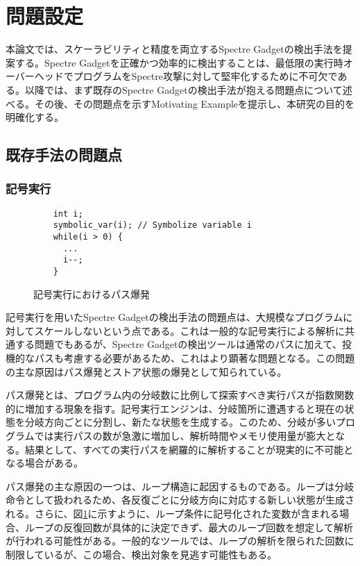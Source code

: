 \section{問題設定}
本論文では、スケーラビリティと精度を両立するSpectre Gadgetの検出手法を提案する。Spectre Gadgetを正確かつ効率的に検出することは、最低限の実行時オーバーヘッドでプログラムをSpectre攻撃に対して堅牢化するために不可欠である。以降では、まず既存のSpectre Gadgetの検出手法が抱える問題点について述べる。その後、その問題点を示すMotivating Exampleを提示し、本研究の目的を明確化する。

\subsection{既存手法の問題点}

\subsubsection{記号実行}

\begin{figure}
  \begin{verbatim}
    int i;
    symbolic_var(i); // Symbolize variable i
    while(i > 0) {
      ...
      i--;
    }
\end{verbatim}
  \caption{記号実行におけるパス爆発}
  \label{path_explosion}
\end{figure}



記号実行を用いたSpectre Gadgetの検出手法\cite{guarnieri2020spectector,wang2020kleespectre}の問題点は、大規模なプログラムに対してスケールしないという点である。これは一般的な記号実行による解析に共通する問題でもあるが、Spectre Gadgetの検出ツールは通常のパスに加えて、投機的なパスも考慮する必要があるため、これはより顕著な問題となる。この問題の主な原因はパス爆発とストア状態の爆発として知られている\cite{baldoni2018survey}。\par

パス爆発とは、プログラム内の分岐数に比例して探索すべき実行パスが指数関数的に増加する現象を指す。記号実行エンジンは、分岐箇所に遭遇すると現在の状態を分岐方向ごとに分割し、新たな状態を生成する。このため、分岐が多いプログラムでは実行パスの数が急激に増加し、解析時間やメモリ使用量が膨大となる。結果として、すべての実行パスを網羅的に解析することが現実的に不可能となる場合がある。\par

パス爆発の主な原因の一つは、ループ構造に起因するものである。ループは分岐命令として扱われるため、各反復ごとに分岐方向に対応する新しい状態が生成される。さらに、図\ref{path_explosion}に示すように、ループ条件に記号化された変数が含まれる場合、ループの反復回数が具体的に決定できず、最大のループ回数を想定して解析が行われる可能性がある。一般的なツールでは、ループの解析を限られた回数に制限しているが、この場合、検出対象を見逃す可能性もある。\par

